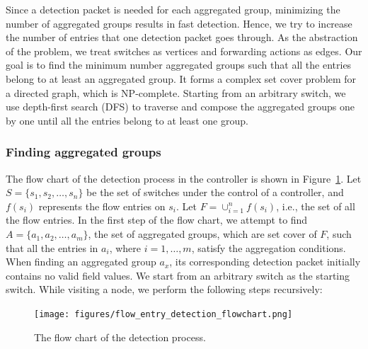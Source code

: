 \documentclass[conference]{IEEEtran}
\begin{document}
\setlength{\textfloatsep}{4pt}
\setlength{\floatsep}{4pt}
\setlength{\intextsep}{3pt}
\setlength{\dbltextfloatsep}{4pt}
\setlength{\dblfloatsep}{4pt}

Since a detection packet is needed for each aggregated group, minimizing the number of aggregated groups results in fast detection. Hence, we try to increase the number of entries that one detection packet goes through. As the abstraction of the problem, we treat switches as vertices and forwarding actions as edges. Our goal is to find the minimum number aggregated groups such that all the entries belong to at least an aggregated group. It forms a complex set cover problem for a directed graph, which is NP-complete. Starting from an arbitrary switch, we use depth-first search (DFS) to traverse and compose the aggregated groups one by one until all the entries belong to at least one group. 

\subsubsection{Finding aggregated groups}
\label{Aggregated_group_finding}

The flow chart of the detection process in the controller is shown in Figure~\ref{flow_entry_detection_flowchart}. Let $S=\{s_1,s_2,\ldots,s_n\}$ be the set of switches under the control of a controller, and $f(s_i)$ represents the flow entries on $s_i$. Let $F=\cup_{i=1}^n f(s_i)$, i.e., the set of all the flow entries. In the first step of the flow chart, we attempt to find $A=\{a_1, a_2, \ldots, a_m\}$, the set of aggregated groups, which are set cover of $F$, such that all the entries in $a_i$, where $i=1,\ldots,m$, satisfy the aggregation conditions. When finding an aggregated group $a_x$, its corresponding detection packet initially contains no valid field values. We start from an arbitrary switch as the starting switch. While visiting a node, we perform the following steps recursively:

\begin{figure}[ht]
\centering
\texttt{[image: figures/flow\_entry\_detection\_flowchart.png]}
\caption{The flow chart of the detection process.}
\label{flow_entry_detection_flowchart}
\end{figure}
\end{document}

